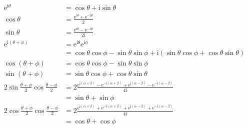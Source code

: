 \documentclass[12pt,a4paper]{ctexart}
\begin{document}
\begin{align*}
    \text{e}^{\text{i}\theta} &= \cos \theta + \text{i} \sin \theta \\
    \cos \theta &= \frac{\text{e}^{\text{i}\theta} + \text{e}^{-\text{i}\theta}}{2} \\
    \sin \theta &= \frac{\text{e}^{\text{i}\theta} - \text{e}^{-\text{i}\theta}}{2\text{i}} \\
    \text{e}^{\text{i}(\theta + \phi)} &= \text{e}^{\text{i}\theta}\text{e}^{\text{i}\phi} \\ 
    &= \cos \theta \cos \phi - \sin \theta \sin \phi + \text{i}\left( \sin \theta \cos \phi + \cos \theta \sin \theta \right) \\
    \cos(\theta + \phi) &= \cos \theta \cos \phi - \sin \theta \sin \phi \\
    \sin(\theta + \phi) &=  \sin \theta \cos \phi + \cos \theta \sin \theta  \\
    2 \sin\frac{\theta + \phi}{2} \cos \frac{\theta - \phi}{2} &= 2 \frac{\text{e}^{\text{i}(\alpha+\beta)} - \text{e}^{-\text{i}(\alpha+\beta)} +\text{e}^{\text{i}(\alpha-\beta)} - \text{e}^{-\text{i}(\alpha-\beta)} }{4 \text{i}} \\
    &= \sin \theta + \sin \phi \\
    2 \cos \frac{\theta + \phi}{2} \cos \frac{\theta - \phi}{2} &= 2 \frac{\text{e}^{\text{i}(\alpha+\beta)} + \text{e}^{-\text{i}(\alpha+\beta)} +\text{e}^{\text{i}(\alpha-\beta)} + \text{e}^{-\text{i}(\alpha-\beta)} }{4 \text{i}} \\
    &= \cos \theta + \cos \phi \\
\end{align*}
\end{document}
